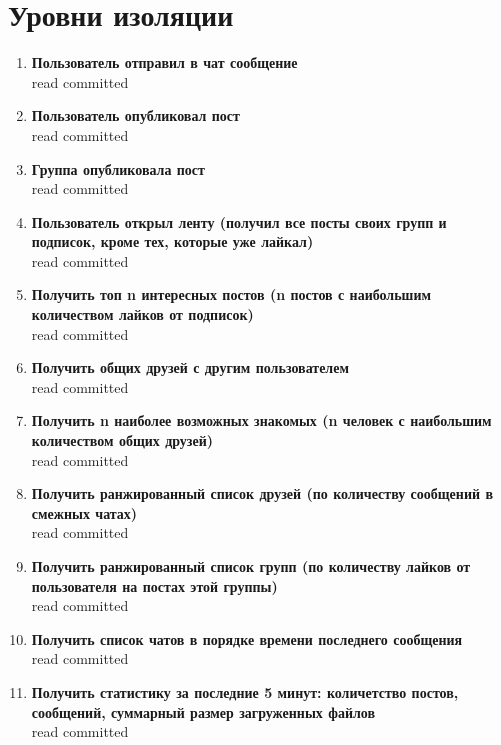 \documentclass[12pt, a4paper] {ncc}
\begin{document}
\section{Уровни изоляции}
\begin{enumerate}
\item \textbf{Пользователь отправил в чат сообщение} \\
read committed
\item \textbf{Пользователь опубликовал пост} \\
read committed
\item \textbf{Группа опубликовала пост} \\
read committed
\item \textbf{Пользователь открыл ленту (получил все посты своих групп и подписок, кроме тех, которые уже лайкал)} \\
read committed
\item \textbf{Получить топ n интересных постов (n постов с наибольшим количеством лайков от подписок)} \\
read committed
\item \textbf{Получить общих друзей с другим пользователем} \\
read committed
\item \textbf{Получить n наиболее возможных знакомых (n человек с наибольшим количеством общих друзей)} \\
read committed
\item \textbf{Получить ранжированный список друзей (по количеству сообщений в смежных чатах)} \\
read committed
\item \textbf{Получить ранжированный список групп (по количеству лайков от пользователя на постах этой группы)} \\
read committed
\item \textbf{Получить список чатов в порядке времени последнего сообщения} \\
read committed
\item \textbf{Получить статистику за последние 5 минут: количетство постов, сообщений, суммарный размер загруженных файлов} \\
read committed
\end{enumerate}
\end{document}
